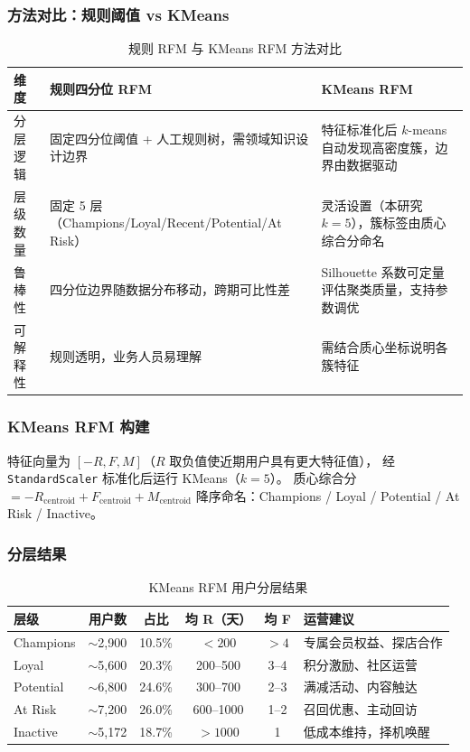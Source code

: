\documentclass[12pt, a4paper]{article}
\begin{document}
\subsubsection{方法对比：规则阈值 vs KMeans}

\begin{table}[H]
\centering
\caption{规则 RFM 与 KMeans RFM 方法对比}
\label{tab:rfm_compare}
\begin{tabularx}{\textwidth}{l X X}
\toprule
\textbf{维度} & \textbf{规则四分位 RFM} & \textbf{KMeans RFM} \\
\midrule
分层逻辑 & 固定四分位阈值 + 人工规则树，需领域知识设计边界 &
  特征标准化后 $k$-means 自动发现高密度簇，边界由数据驱动 \\
层级数量 & 固定 5 层（Champions/Loyal/Recent/Potential/At Risk） &
  灵活设置（本研究 $k=5$），簇标签由质心综合分命名 \\
鲁棒性 & 四分位边界随数据分布移动，跨期可比性差 &
  Silhouette 系数可定量评估聚类质量，支持参数调优 \\
可解释性 & 规则透明，业务人员易理解 & 需结合质心坐标说明各簇特征 \\
\bottomrule
\end{tabularx}
\end{table}

\subsubsection{KMeans RFM 构建}

特征向量为 $[-R, F, M]$（$R$ 取负值使近期用户具有更大特征值），
经 \texttt{StandardScaler} 标准化后运行 KMeans（$k=5$）。
质心综合分 $= -R_{\text{centroid}} + F_{\text{centroid}} + M_{\text{centroid}}$
降序命名：Champions / Loyal / Potential / At Risk / Inactive。

\subsubsection{分层结果}

\begin{table}[H]
\centering
\caption{KMeans RFM 用户分层结果}
\label{tab:km_rfm}
\begin{tabularx}{\textwidth}{l c c c c X}
\toprule
\textbf{层级} & \textbf{用户数} & \textbf{占比} & \textbf{均 R（天）} & \textbf{均 F} & \textbf{运营建议} \\
\midrule
Champions & $\sim$2,900 & 10.5\% & $<200$  & $>4$ & 专属会员权益、探店合作 \\
Loyal     & $\sim$5,600 & 20.3\% & 200--500 & 3--4 & 积分激励、社区运营 \\
Potential & $\sim$6,800 & 24.6\% & 300--700 & 2--3 & 满减活动、内容触达 \\
At Risk   & $\sim$7,200 & 26.0\% & 600--1000 & 1--2 & 召回优惠、主动回访 \\
Inactive  & $\sim$5,172 & 18.7\% & $>1000$  & 1    & 低成本维持，择机唤醒 \\
\bottomrule
\end{tabularx}
\end{table}
\end{document}
